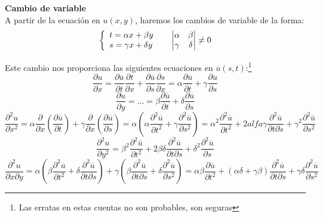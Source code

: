 \documentclass[openany]{book}
\begin{document}
\begin{method}
  \textbf{Cambio de variable}\\

  A partir de la ecuación en $ u(x,y) $, haremos los cambios de variable de la forma:
  $$ \left\{
  \begin{array}{l}
    t = \alpha x + \beta y\\ 
    s = \gamma x + \delta y 
  \end{array}
  \right.\hspace{5mm} \begin{vmatrix} \alpha & \beta \\ \gamma & \delta  \end{vmatrix} \ne 0 $$
  
  Este cambio nos proporciona las siguientes ecuaciones en $ \overline{u}(s,t) $:\footnote{Las erratas en estas cuentas no son probables, son seguras}
  $$ \dfrac{\partial u}{\partial x} = \dfrac{\partial \overline{u}}{\partial t} \dfrac{\partial  t}{\partial x} + \dfrac{\partial \overline{u}}{\partial s} \dfrac{\partial s}{\partial x} = \alpha \dfrac{\partial \overline{u}}{\partial t} + \gamma \dfrac{\partial \overline{u}}{\partial s}$$
  $$ \dfrac{\partial u}{\partial y} = ... = \beta \dfrac{\partial \overline{u}}{\partial t}+\delta \dfrac{\partial \overline{u}}{\partial s} $$
  $$ \dfrac{\partial ^2 u}{\partial x^2} = \alpha \dfrac{\partial }{\partial x} \left( \dfrac{\partial \overline{u}}{\partial t}\right) + \gamma \dfrac{\partial }{\partial x} \left( \dfrac{\partial \overline{u}}{\partial s}\right) = \alpha \left( \alpha \dfrac{\partial ^2 \overline{u}}{\partial t^2}+\gamma \dfrac{\partial ^2\overline{u}}{ \partial s^2}\right) = \alpha^2 \dfrac{\partial ^2 \overline{u}}{\partial t^2} + 2alfa \gamma \dfrac{\partial ^2 \overline{u}}{\partial t \partial s} +\gamma^2 \dfrac{\partial ^2 \overline{u}}{\partial s^2}  $$
  $$ \dfrac{\partial ^2 u}{\partial y^2} = \beta^2 \dfrac{\partial ^2 \overline{u}}{\partial t^2}+2 \beta \delta \dfrac{\partial ^2\overline{u}}{\partial t\partial s} +\delta ^2 \dfrac{\partial^2 \overline{u}}{\partial s} $$
  $$ \dfrac{\partial ^2u}{\partial x \partial y} = \alpha \left(\beta \dfrac{\partial ^2\overline{u}}{\partial t^2}+\delta \dfrac{\partial ^2\overline{u}}{\partial t \partial s}\right) + \gamma \left(\beta \dfrac{\partial ^2 \overline{u}}{\partial t \partial s} + \delta \dfrac{\partial ^2 \overline{u}}{\partial s^2}\right) = \alpha \beta \dfrac{\partial \overline{u}}{\partial t^2} + (\alpha \delta + \gamma \beta) \dfrac{\partial ^2 \overline{u}}{\partial t \partial s} + \gamma \delta \dfrac{\partial ^2 \overline{u}}{\partial s^2} $$


\end{method}
\end{document}
